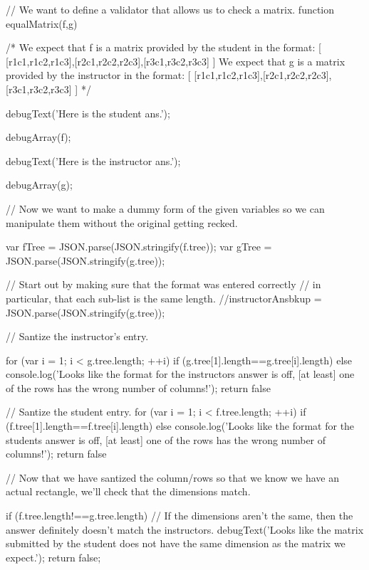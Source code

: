 \documentclass{ximera}
\begin{document}
\begin{javascript}

// We want to define a validator that allows us to check a matrix.
function equalMatrix(f,g) {
    /* We expect that f is a matrix provided by the student in the format:
            [ [r1c1,r1c2,r1c3],[r2c1,r2c2,r2c3],[r3c1,r3c2,r3c3] ]
       We expect that g is a matrix provided by the instructor in the format:
            [ [r1c1,r1c2,r1c3],[r2c1,r2c2,r2c3],[r3c1,r3c2,r3c3] ]
    */
    
    
    debugText('Here is the student ans.');
    
    debugArray(f);
    
    debugText('Here is the instructor ans.');
    
    debugArray(g);
    
    //  Now we want to make a dummy form of the given variables so we can manipulate them without the original getting recked.
   
    var fTree = JSON.parse(JSON.stringify(f.tree));
    var gTree = JSON.parse(JSON.stringify(g.tree));
    
    
    // Start out by making sure that the format was entered correctly
    //  in particular, that each sub-list is the same length.
    //instructorAnsbkup = JSON.parse(JSON.stringify(g.tree));
    
    // Santize the instructor's entry.
    
    for (var i = 1; i < g.tree.length; ++i) {
        if (g.tree[1].length==g.tree[i].length) {
        } else {
            console.log('Looks like the format for the instructors answer is off, [at least] one of the rows has the wrong number of columns!');
            return false
        }
    }

    // Santize the student entry.
    for (var i = 1; i < f.tree.length; ++i) {
        if (f.tree[1].length==f.tree[i].length) {
        } else {
            console.log('Looks like the format for the students answer is off, [at least] one of the rows has the wrong number of columns!');
            return false
        }
    }
    
    // Now that we have santized the column/rows so that we know we have an actual rectangle, we'll check that the dimensions match.
    
    if (f.tree.length!==g.tree.length) {
        // If the dimensions aren't the same, then the answer definitely doesn't match the instructors.
        debugText('Looks like the matrix submitted by the student does not have the same dimension as the matrix we expect.');
        return false;
    }
    
}
\end{javascript}
\end{document}
